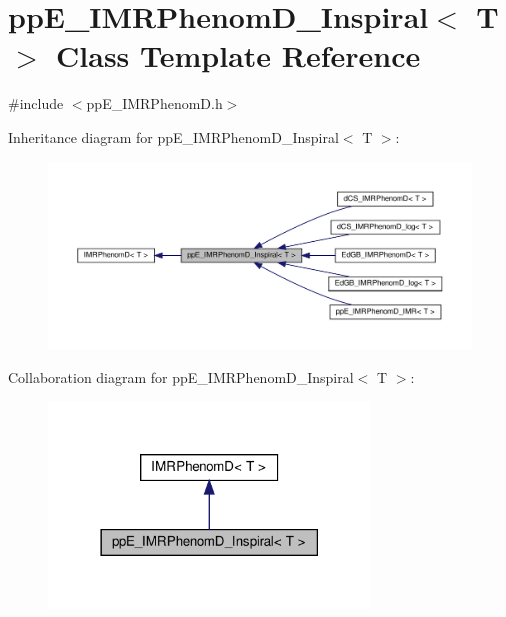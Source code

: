 \hypertarget{classppE__IMRPhenomD__Inspiral}{}\section{pp\+E\+\_\+\+I\+M\+R\+Phenom\+D\+\_\+\+Inspiral$<$ T $>$ Class Template Reference}
\label{classppE__IMRPhenomD__Inspiral}


{\ttfamily \#include $<$pp\+E\+\_\+\+I\+M\+R\+Phenom\+D.\+h$>$}



Inheritance diagram for pp\+E\+\_\+\+I\+M\+R\+Phenom\+D\+\_\+\+Inspiral$<$ T $>$\+:\nopagebreak
\begin{figure}[H]
\begin{center}
\leavevmode
\includegraphics[width=350pt]{classppE__IMRPhenomD__Inspiral__inherit__graph}
\end{center}
\end{figure}


Collaboration diagram for pp\+E\+\_\+\+I\+M\+R\+Phenom\+D\+\_\+\+Inspiral$<$ T $>$\+:\nopagebreak
\begin{figure}[H]
\begin{center}
\leavevmode
\includegraphics[width=242pt]{classppE__IMRPhenomD__Inspiral__coll__graph}
\end{center}
\end{figure}
